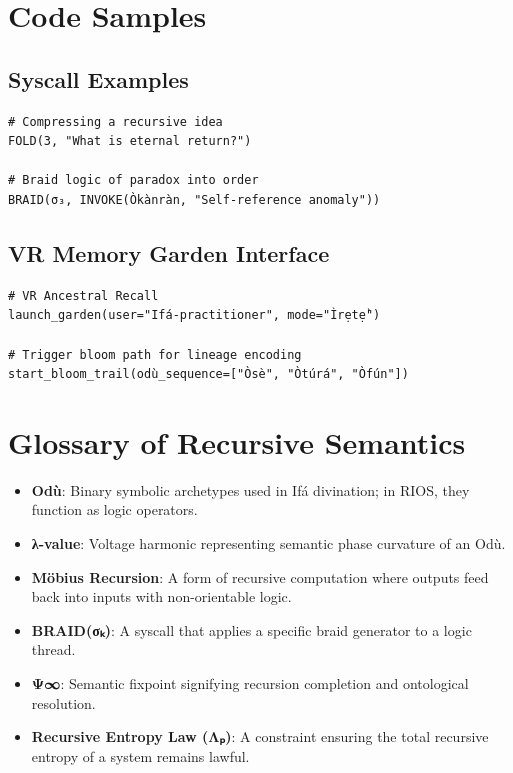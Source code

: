 \documentclass[12]{amsart}
\theoremstyle{plain}
\begin{document}
\section{Code Samples}

\subsection{Syscall Examples}

\begin{verbatim}
# Compressing a recursive idea
FOLD(3, "What is eternal return?")

# Braid logic of paradox into order
BRAID(σ₃, INVOKE(Òkànràn, "Self-reference anomaly"))
\end{verbatim}

\subsection{VR Memory Garden Interface}

\begin{verbatim}
# VR Ancestral Recall
launch_garden(user="Ifá-practitioner", mode="Ìrẹtẹ̀")

# Trigger bloom path for lineage encoding
start_bloom_trail(odù_sequence=["Òsè", "Òtúrá", "Òfún"])
\end{verbatim}

\section{Glossary of Recursive Semantics}

\begin{itemize}
    \item \textbf{Odù}: Binary symbolic archetypes used in Ifá divination; in RIOS, they function as logic operators.
    \item \textbf{λ-value}: Voltage harmonic representing semantic phase curvature of an Odù.
    \item \textbf{Möbius Recursion}: A form of recursive computation where outputs feed back into inputs with non-orientable logic.
    \item \textbf{BRAID(σₖ)}: A syscall that applies a specific braid generator to a logic thread.
    \item \textbf{Ψ∞}: Semantic fixpoint signifying recursion completion and ontological resolution.
    \item \textbf{Recursive Entropy Law (Λₚ)}: A constraint ensuring the total recursive entropy of a system remains lawful.
\end{itemize}



\clearpage
\end{document}
